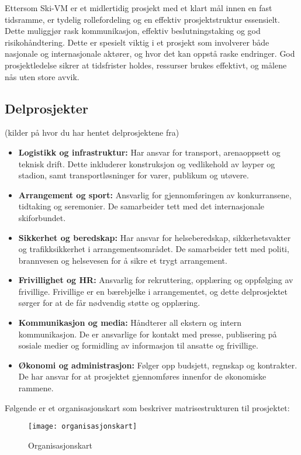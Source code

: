 Ettersom Ski-VM er et midlertidig prosjekt med et klart mål innen en fast tidsramme, er tydelig rollefordeling og en effektiv prosjektstruktur essensielt. Dette muliggjør rask kommunikasjon, effektiv beslutningstaking og god risikohåndtering. Dette er spesielt viktig i et prosjekt som involverer både nasjonale og internasjonale aktører, og hvor det kan oppstå raske endringer. God prosjektledelse sikrer at tidsfrister holdes, ressurser brukes effektivt, og målene nås uten store avvik.

\subsection*{Delprosjekter}(kilder på hvor du har hentet delprosjektene fra)

\begin{itemize}
    \item \textbf{Logistikk og infrastruktur:} Har ansvar for transport, arenaoppsett og teknisk drift. Dette inkluderer konstruksjon og vedlikehold av løyper og stadion, samt transportløsninger for varer, publikum og utøvere.
    
    \item \textbf{Arrangement og sport:} Ansvarlig for gjennomføringen av konkurransene, tidtaking og seremonier. De samarbeider tett med det internasjonale skiforbundet.
    
    \item \textbf{Sikkerhet og beredskap:} Har ansvar for helseberedskap, sikkerhetsvakter og trafikksikkerhet i arrangementsområdet. De samarbeider tett med politi, brannvesen og helsevesen for å sikre et trygt arrangement.
    
    \item \textbf{Frivillighet og HR:} Ansvarlig for rekruttering, opplæring og oppfølging av frivillige. Frivillige er en bærebjelke i arrangementet, og dette delprosjektet sørger for at de får nødvendig støtte og opplæring.
    
    \item \textbf{Kommunikasjon og media:} Håndterer all ekstern og intern kommunikasjon. De er ansvarlige for kontakt med presse, publisering på sosiale medier og formidling av informasjon til ansatte og frivillige.
    
    \item \textbf{Økonomi og administrasjon:} Følger opp budsjett, regnskap og kontrakter. De har ansvar for at prosjektet gjennomføres innenfor de økonomiske rammene.
\end{itemize}
Følgende er et organisasjonskart som beskriver matrisestrukturen til prosjektet:
\begin{figure}[h]
    \centering
    \texttt{[image: organisasjonskart]}
    \caption{Organisasjonskart}
    \label{fig:organisasjonskart}
\end{figure}